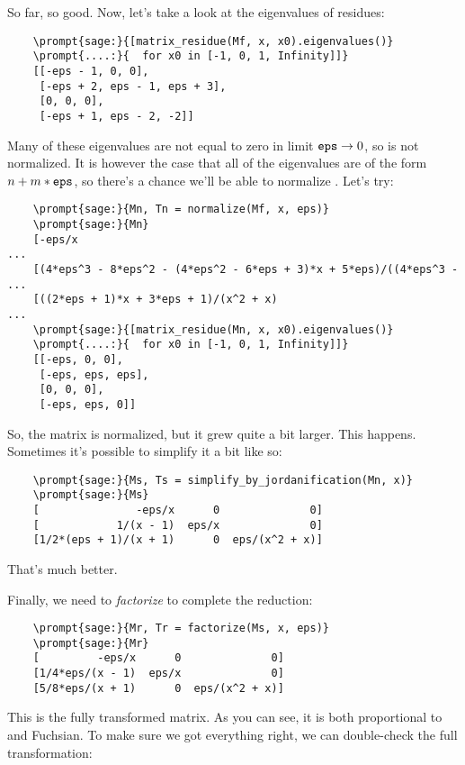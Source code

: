 \documentclass[12pt,a4paper]{article}
\begin{document}
So far, so good. Now, let's take a look at the eigenvalues of  residues:

\begin{Verbatim}
    \prompt{sage:}{[matrix_residue(Mf, x, x0).eigenvalues()}
    \prompt{....:}{  for x0 in [-1, 0, 1, Infinity]]}
    [[-eps - 1, 0, 0],
     [-eps + 2, eps - 1, eps + 3],
     [0, 0, 0],
     [-eps + 1, eps - 2, -2]]
\end{Verbatim}

Many of these eigenvalues are not equal to zero in limit $\texttt{eps}\to0$, so  is not normalized.
It is however the case that all of the eigenvalues are of the form $n + m*\texttt{eps}$, so there's a chance we'll be able to normalize .
Let's try:

\begin{Verbatim}
    \prompt{sage:}{Mn, Tn = normalize(Mf, x, eps)}
    \prompt{sage:}{Mn}
    [-eps/x                                                            ...
    [(4*eps^3 - 8*eps^2 - (4*eps^2 - 6*eps + 3)*x + 5*eps)/((4*eps^3 - ...
    [((2*eps + 1)*x + 3*eps + 1)/(x^2 + x)                             ...
    \prompt{sage:}{[matrix_residue(Mn, x, x0).eigenvalues()}
    \prompt{....:}{  for x0 in [-1, 0, 1, Infinity]]}
    [[-eps, 0, 0],
     [-eps, eps, eps],
     [0, 0, 0],
     [-eps, eps, 0]]
\end{Verbatim}

So, the matrix is normalized, but it grew quite a bit larger.
This happens.
Sometimes it's possible to simplify it a bit like so:

\begin{Verbatim}
    \prompt{sage:}{Ms, Ts = simplify_by_jordanification(Mn, x)}
    \prompt{sage:}{Ms}
    [               -eps/x      0              0]
    [            1/(x - 1)  eps/x              0]
    [1/2*(eps + 1)/(x + 1)      0  eps/(x^2 + x)]
\end{Verbatim}

That's much better.

Finally, we need to \textit{factorize}  to complete the reduction:

\begin{Verbatim}
    \prompt{sage:}{Mr, Tr = factorize(Ms, x, eps)}
    \prompt{sage:}{Mr}
    [         -eps/x      0              0]
    [1/4*eps/(x - 1)  eps/x              0]
    [5/8*eps/(x + 1)      0  eps/(x^2 + x)]
\end{Verbatim}

This is the fully transformed matrix.
As you can see, it is both proportional to  and Fuchsian.
To make sure we got everything right, we can double-check the full transformation:
\end{document}
